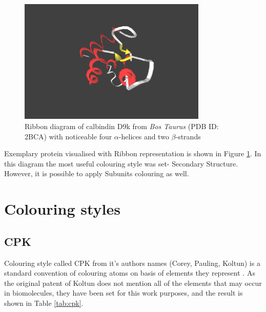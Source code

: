 \begin{figure}[!htb]
\centering    
\includegraphics[width=0.8\textwidth]{Figs/ribbon.png}
\caption{Ribbon diagram of calbindin D9k from \textit{Bos Taurus} (PDB ID: 2BCA) with noticeable four $\alpha$-helices and two $\beta$-strands}
\label{fig:ribbon} 
\end{figure}

Exemplary protein visualised with Ribbon representation is shown in Figure \ref{fig:ribbon}. In this diagram the most useful colouring style was set- Secondary Structure. However, it is possible to apply Subunits colouring as well.

 


\section{Colouring styles} %
\subsection{CPK}
Colouring style called CPK from it's authors names (Corey, Pauling, Koltun) is a standard convention of colouring atoms on basis of elements they represent \cite{Koltun65}. As the original patent of Koltun does not mention all of the elements that may occur in biomolecules, they have been set for this work purposes, and the result is shown in Table \ref{tab:cpk}.

